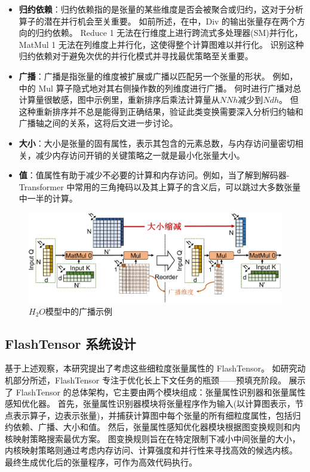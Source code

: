 \begin{itemize}

\item 
\textbf{归约依赖}：归约依赖指的是张量的某些维度是否会被聚合或归约，这对于分析算子的潜在并行机会至关重要。
如前所述，在中，Div 的输出张量存在两个方向的归约依赖。
Reduce 1 无法在行维度上进行跨流式多处理器(SM)并行化，MatMul 1 无法在列维度上并行化，这使得整个计算图难以并行化。
识别这种归约依赖对于避免次优的并行化模式并寻找最优策略至关重要。
\item
\textbf{广播}：广播是指张量的维度被扩展或广播以匹配另一个张量的形状。
例如，中的 Mul 算子隐式地对其右侧操作数的列维度进行广播。
何时进行广播对总计算量很敏感，图中示例里，重新排序后乘法计算量从\(NNh\)减少到\(Ndh\)。
但这种重新排序并不总是能得到正确结果，验证此类变换需要深入分析归约轴和广播轴之间的关系，这将后文进一步讨论。
\item
\textbf{大小}：大小是张量的固有属性，表示其包含的元素总数，与内存访问量密切相关，减少内存访问开销的关键策略之一就是最小化张量大小。
\item
\textbf{值}：值属性有助于减少不必要的计算和内存访问。例如，当了解到解码器-Transformer 中常用的三角掩码以及其上算子的含义后，可以跳过大多数张量中一半的计算。

\end{itemize}

\begin{figure}[htbp]
    \centering
    \includegraphics[width=0.7\linewidth]{figures/flashtensor/motivation_example_dependency_and_value-crop.pdf}
    \caption{\(H_{2}O\)模型中的广播示例}
    \label{fig:dependency_and_broadcast_example}
\end{figure}

\subsection{FlashTensor 系统设计}
基于上述观察，本研究提出了考虑这些细粒度张量属性的 FlashTensor。
如研究动机部分所述，FlashTensor 专注于优化长上下文任务的瓶颈——预填充阶段。
展示了 FlashTensor 的总体架构，它主要由两个模块组成：张量属性识别器和张量属性感知优化器。
首先，张量属性识别器模块将张量程序作为输入(以计算图表示，节点表示算子，边表示张量)，并捕获计算图中每个张量的所有细粒度属性，包括归约依赖、广播、大小和值。
然后，张量属性感知优化器模块根据图变换规则和内核映射策略搜索最优方案。
图变换规则旨在在特定限制下减小中间张量的大小，内核映射策略则通过考虑内存访问、计算强度和并行性来寻找高效的候选内核。
最终生成优化后的张量程序，可作为高效代码执行。

